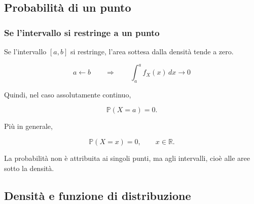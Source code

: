 \documentclass[handout]{beamer}%
\providecommand{\Prob}{\mathbb{P}}
\providecommand{\1}{\mathbf{1}}
\providecommand{\QTR}[2]{\csname #1\endcsname{#2}}
\begin{document}


\subsection{Probabilit\`{a} di un punto}%

\begin{frame}%
%

\frametitle{Se l'intervallo si restringe a un punto}%


Se l'intervallo $[a,b]$ si restringe, l'area sottesa dalla densit\`{a} tende a zero.%

\[
a\leftarrow b \qquad\Longrightarrow\qquad\int_{a}^{a} f_{X}(x)\,dx\to0
\]


\medskip

Quindi, nel caso assolutamente continuo,%

\[
\Prob(X=a)=0.
\]


\medskip

Pi\`{u} in generale,%

\[
\Prob(X=x)=0, \qquad x\in\mathbb{R}.
\]


\medskip

La probabilit\`{a} non \`{e} attribuita ai singoli punti, ma agli intervalli,
cio\`{e} alle aree sotto la densit\`{a}.%

\transboxout
\end{frame}%




\subsection{Densit\`{a} e funzione di distribuzione}%
\end{document}
